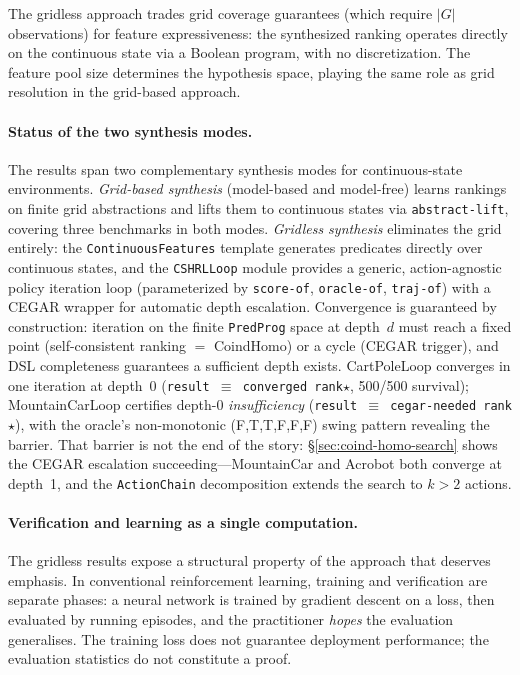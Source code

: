 \documentclass[9pt,a4paper]{article}
\theoremstyle{plain}
\theoremstyle{definition}
\theoremstyle{remark}
\begin{document}
The gridless approach trades grid coverage guarantees (which require $|G|$ observations) for feature expressiveness: the synthesized ranking operates directly on the continuous state via a Boolean program, with no discretization.  The feature pool size determines the hypothesis space, playing the same role as grid resolution in the grid-based approach.

\paragraph{Status of the two synthesis modes.}
The results span two complementary synthesis modes for continuous-state environments.  \emph{Grid-based synthesis} (model-based and model-free) learns rankings on finite grid abstractions and lifts them to continuous states via \texttt{abstract-lift}, covering three benchmarks in both modes.  \emph{Gridless synthesis} eliminates the grid entirely: the \texttt{ContinuousFeatures} template generates predicates directly over continuous states, and the \texttt{CSHRLLoop} module provides a generic, action-agnostic policy iteration loop (parameterized by \texttt{score-of}, \texttt{oracle-of}, \texttt{traj-of}) with a CEGAR wrapper for automatic depth escalation.  Convergence is guaranteed by construction: iteration on the finite \texttt{PredProg} space at depth~$d$ must reach a fixed point (self-consistent ranking $=$ CoindHomo) or a cycle (CEGAR trigger), and DSL completeness guarantees a sufficient depth exists.  CartPoleLoop converges in one iteration at depth~0 (\texttt{result~$\equiv$~converged~rank$\star$}, 500/500 survival); MountainCarLoop certifies depth-0 \emph{insufficiency} (\texttt{result~$\equiv$~cegar-needed~rank$\star$}), with the oracle's non-monotonic (F,T,T,F,F,F) swing pattern revealing the barrier.  That barrier is not the end of the story: \S\ref{sec:coind-homo-search} shows the CEGAR escalation succeeding---MountainCar and Acrobot both converge at depth~1, and the \texttt{ActionChain} decomposition extends the search to $k > 2$ actions.

\paragraph{Verification and learning as a single computation.}
The gridless results expose a structural property of the approach that deserves emphasis.  In conventional reinforcement learning, training and verification are separate phases: a neural network is trained by gradient descent on a loss, then evaluated by running episodes, and the practitioner \emph{hopes} the evaluation generalises.  The training loss does not guarantee deployment performance; the evaluation statistics do not constitute a proof.
\end{document}

